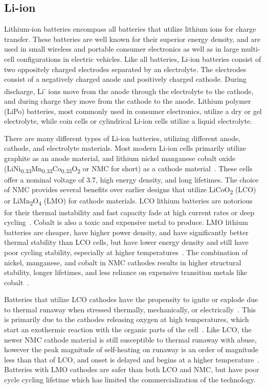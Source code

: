 \subsection{Li-ion}
Lithium-ion batteries encompass all batteries that utilize lithium ions for charge transfer. These batteries are well known for their superior energy density, and are used in small wireless and portable consumer electronics as well as in large multi-cell configurations in electric vehicles.
Like all batteries, Li-ion batteries consist of two oppositely charged electrodes separated by an electrolyte. The electrodes consist of a negatively charged anode and positively charged cathode. During discharge, Li\textsuperscript{-} ions move from the anode through the electrolyte to the cathode, and during charge they move from the cathode to the anode.
Lithium polymer (LiPo) batteries, most commonly used in consumer electronics, utilize a dry or gel electrolyte, while coin cells or cylindrical Li-ion cells utilize a liquid electrolyte. 

There are many different types of Li-ion batteries, utilizing different anode, cathode, and electrolyte materials. Most modern Li-ion cells primarily utilize graphite as an anode material, and lithium nickel manganese cobalt oxide
(LiNi\textsubscript{0.33}Mn\textsubscript{0.33}Co\textsubscript{0.33}O\textsubscript{2} or NMC for short) as a cathode material~\cite{nitta2015li}.
These cells offer a nominal voltage of 3.7\ssi{\volt}, high energy density, and long lifetimes. 
The choice of NMC provides several benefits over earlier designs that utilize 
LiCoO\textsubscript{2} (LCO) or LiMn\textsubscript{2}O\textsubscript{4} (LMO) for cathode materials.
LCO lithium batteries are notorious for their thermal instability and fast capacity fade at high current rates or deep cycling~\cite{nitta2015li}. 
Cobalt is also a toxic and expensive metal to produce. 
LMO lithium batteries are cheaper, have higher power density, and have significantly better thermal stability than LCO cells, but have lower energy density and still have poor cycling stability, especially at higher temperatures~\cite{nitta2015li}.
The combination of nickel, manganese, and cobalt in NMC cathodes results in higher structural stability, longer lifetimes, and less reliance on expensive transition metals like cobalt~\cite{nitta2015li}. 

Batteries that utilize LCO cathodes have the propensity to ignite or explode due to thermal runaway when stressed thermally, mechanically, or electrically~\cite{doughty2012general}. This is primarily due to the cathodes releasing oxygen at high temperatures, which start an exothermic reaction with the organic parts of the cell~\cite{doughty2012general, nitta2015li}. Like LCO, the newer NMC cathode material is still susceptible to thermal runaway with abuse, however the peak magnitude of self-heating on runaway is an order of magnitude less than that of LCO, and onset is delayed and begins at a higher temperature~\cite{doughty2012general}.
Batteries with LMO cathodes are safer than both LCO and NMC, but have poor cycle cycling lifetime which has limited the commercialization of the technology. 

